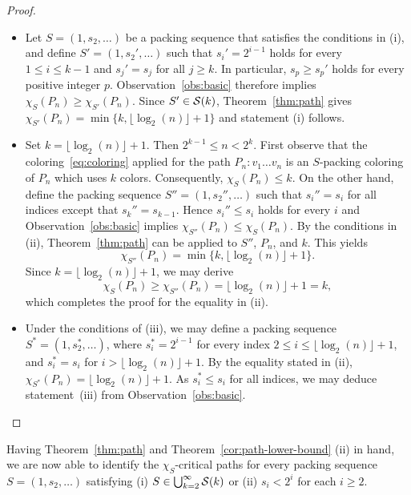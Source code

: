 \documentclass[12pt]{article}
\newcommand{\cS}{{\cal S}}
\begin{document}
   \begin{proof}  
   \begin{itemize}
     \item[(i)] Let $S=(1,s_2, \dots)$ be a packing sequence that satisfies the conditions in (i), and define  $S'=(1,s_2', \dots) $ such that $s_i'= 2^{i-1}$ holds for every $1 \le i \le k-1$ and $s_j'= s_j$ for all $j \ge k$. In particular, $s_p \ge s_p'$ holds for every positive integer $p$. Observation~\ref{obs:basic} therefore implies $\chi_S(P_n) \ge \chi_{S'} (P_n)$. Since $S' \in \cS(k)$, Theorem~\ref{thm:path} gives $\chi_{S'}(P_n)=  \min \{k,\lfloor \log_2(n) \rfloor +1\}$ and statement (i) follows.

       \item[(ii)] Set $k= \lfloor \log_2(n) \rfloor +1$. Then $2^{k-1} \leq n < 2^{k}$.  First observe that the coloring~\eqref{eq:coloring} applied for the path $P_n\colon v_1 \dots v_n$ is an $S$-packing coloring of $P_n$ which uses $k$ colors. Consequently, $\chi_S(P_n) \leq k$.  On the other hand, define the packing sequence $S''= (1, s_2'', \dots)$ such that $s_i''=s_i$ for all indices except that $s_k''=s_{k-1}$. Hence $s_i'' \leq s_i$ holds for every $i$ and Observation~\ref{obs:basic} implies $\chi_{S''}(P_n) \leq \chi_{S}(P_n)$. By the conditions in (ii), Theorem~\ref{thm:path} can be applied to $S''$, $P_n$, and $k$. This yields 
        $$ \chi_{S''}(P_n)=  \min \{k,\lfloor \log_2(n) \rfloor +1\}. $$  
      Since $k= \lfloor \log_2(n) \rfloor +1$, we may derive 
      $$ \chi_{S}(P_n) \ge \chi_{S''}(P_n) =\lfloor \log_2(n) \rfloor +1 =k,
      $$
      which completes the proof for the equality in (ii).

       \item[(iii)] Under the conditions of (iii), we may define a packing sequence $S^*=(1, s_2^*,\dots) $, where $s_i^*=2^{i-1}$ for every index $2 \le i \le \lfloor \log_2(n) \rfloor +1$, and $s_i^*=s_i$ for $i > \lfloor \log_2(n) \rfloor +1$. By the equality stated in (ii), $\chi_{S^*}(P_n)  =\lfloor \log_2(n) \rfloor +1$. As $s_i^* \leq s_i$ for all indices, we may deduce statement~(iii) from Observation~\ref{obs:basic}.
   \end{itemize}
   \end{proof}

   Having Theorem~\ref{thm:path} and Theorem~\ref{cor:path-lower-bound} (ii) in hand, we are now able to identify the $\chi_S$-critical paths  for every packing sequence $S=(1,s_2, \dots )$ satisfying (i) $S \in \bigcup_{k=2}^\infty \cS(k)$ or (ii) $s_i < 2^i$  for each $i \ge 2$. 
 
\end{document}
